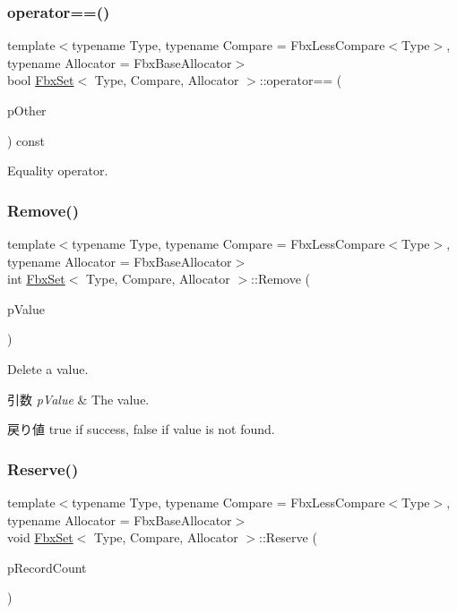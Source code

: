 \subsubsection{\texorpdfstring{operator==()}{operator==()}}
{\footnotesize\ttfamily template$<$typename Type, typename Compare = Fbx\+Less\+Compare$<$\+Type$>$, typename Allocator = Fbx\+Base\+Allocator$>$ \\
bool \hyperlink{class_fbx_set}{Fbx\+Set}$<$ Type, Compare, Allocator $>$\+::operator== (\begin{DoxyParamCaption}\item[{const \hyperlink{class_fbx_set}{Fbx\+Set}$<$ Type, Compare, Allocator $>$ \&}]{p\+Other }\end{DoxyParamCaption}) const}



Equality operator. 

\mbox{\label{class_fbx_set_a12e704b8d6f84a349c27cd40ef4dde11}} 
\subsubsection{\texorpdfstring{Remove()}{Remove()}}
{\footnotesize\ttfamily template$<$typename Type, typename Compare = Fbx\+Less\+Compare$<$\+Type$>$, typename Allocator = Fbx\+Base\+Allocator$>$ \\
int \hyperlink{class_fbx_set}{Fbx\+Set}$<$ Type, Compare, Allocator $>$\+::Remove (\begin{DoxyParamCaption}\item[{const \hyperlink{class_fbx_set_abb0f1b628634e07825532526e2e92baf}{Value\+Type} \&}]{p\+Value }\end{DoxyParamCaption})}

Delete a value. 
\begin{DoxyParams}{引数}
{\em p\+Value} & The value. \\
\hline
\end{DoxyParams}
\begin{DoxyReturn}{戻り値}
{\ttfamily true} if success, {\ttfamily false} if value is not found. 
\end{DoxyReturn}
\mbox{\label{class_fbx_set_ac7d73b7db8fe03350e2ced16ffff1c36}} 
\subsubsection{\texorpdfstring{Reserve()}{Reserve()}}
{\footnotesize\ttfamily template$<$typename Type, typename Compare = Fbx\+Less\+Compare$<$\+Type$>$, typename Allocator = Fbx\+Base\+Allocator$>$ \\
void \hyperlink{class_fbx_set}{Fbx\+Set}$<$ Type, Compare, Allocator $>$\+::Reserve (\begin{DoxyParamCaption}\item[{unsigned int}]{p\+Record\+Count }\end{DoxyParamCaption})}

